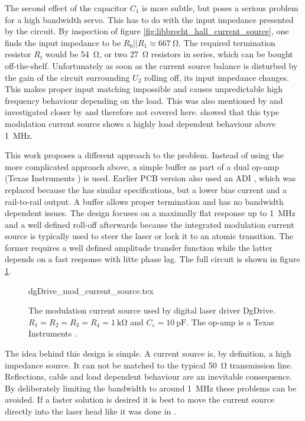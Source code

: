 The second effect of the capacitor $C_1$ is more subtle, but poses a serious problem for a high bandwidth servo. This has to do with the input impedance presented by the circuit. By inspection of figure \ref{fig:libbrecht_hall_current_source}, one finds the input impedance to be $R_6 || R_1 \approx \qty{667}{\ohm}$. The required termination resistor $R_t$ would be \qty{54}{\ohm}, or two \qty{27}{\ohm} resistors in series, which can be bought off-the-shelf. Unfortunately as soon as the current source balance is disturbed by the gain of the circuit surrounding $U_2$ rolling off, its input impedance changes. This makes proper input matching impossible and causes unpredictable high frequency behaviour depending on the load. This was also mentioned by \cite{laser_driver_digital} and investigated closer by \citeauthor{thesis_tilman} \cite{thesis_tilman} and therefore not covered here. \citeauthor{thesis_tilman} showed that this type modulation current source shows a highly load dependent behaviour above \qty{1}{\MHz}.

This work proposes a different approach to the problem. Instead of using the more complicated approach above, a simple buffer as part of a dual op-amp (Texas Instruments  \cite{datasheet_OPA2140}) is used. Earlier PCB version also used an ADI  \cite{datasheet_AD8672}, which was replaced because the  has similar specifications, but a lower bias current and a rail-to-rail output. A buffer allows proper termination and has no bandwidth dependent issues. The design focuses on a maximally flat response up to \qty{1}{\MHz} and a well defined roll-off afterwards because the integrated modulation current source is typically used to steer the laser or lock it to an atomic transition. The former requires a well defined amplitude transfer function while the latter depends on a fast response with litte phase lag. The full circuit is shown in figure \ref{fig:dgDrive_mod_current_source}.
\begin{figure}[ht]
    \centering
        {dgDrive_mod_current_source.tex}
    \caption{The modulation current source used by digital laser driver DgDrive. $R_1=R_2=R_3=R_4 = \qty{1}{\kilo\ohm}$ and $C_c = \qty{10}{\pF}$. The op-amp is a Texas Instruments .}
    \label{fig:dgDrive_mod_current_source}
\end{figure}

The idea behind this design is simple. A current source is, by definition, a high impedance source. It can not be matched to the typical \qty{50}{\ohm} transmission line. Reflections, cable and load dependent behaviour are an inevitable consequence. By deliberately limiting the bandwidth to around \qty{1}{\MHz} these problems can be avoided. If a faster solution is desired it is best to move the current source directly into the laser head like it was done in \cite{current_mod_paper}.

